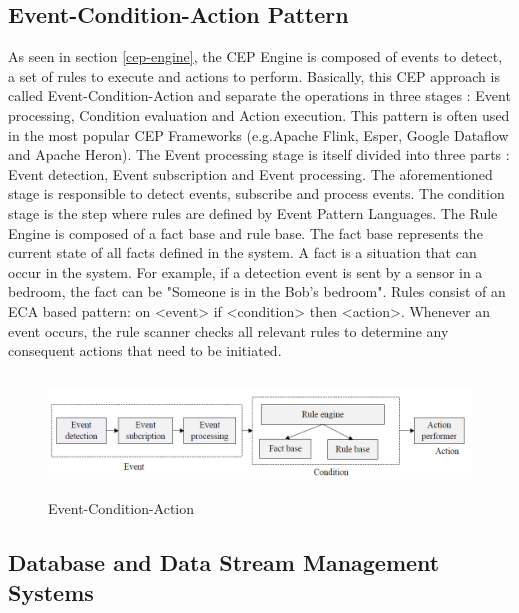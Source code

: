 \documentclass[11pt]{article}
\begin{document}

\subsection{Event-Condition-Action Pattern}

As seen in section \ref{cep-engine}, the CEP Engine is composed of events to detect, a set of rules to execute and actions to perform. Basically, this CEP approach is called Event-Condition-Action and separate the operations in three stages : Event processing, Condition evaluation and Action execution. This pattern is often used in the most popular CEP Frameworks (e.g.Apache Flink, Esper, Google Dataflow and Apache Heron). The Event processing stage is itself divided into three parts : Event detection, Event subscription and Event processing. The aforementioned stage is responsible to detect events, subscribe and process events. The condition stage is the step where rules are defined by Event Pattern Languages. The Rule Engine is composed of a fact base and rule base. The fact base represents the current state of all facts defined in the system. A fact is a situation that can occur in the system. For example, if a detection event is sent by a sensor in a bedroom, the fact can be "Someone is in the Bob's bedroom". Rules consist of an ECA based pattern: on {<}event{>} if {<}condition{>} then {<}action{>}. Whenever an event occurs, the rule scanner checks all relevant rules to determine any consequent actions that need to be initiated. \cite{IoT Architecture based on services and Events}

\begin{figure}[h]
	\includegraphics[width=\textwidth,height=90pt]{assets/ECA_illustration.png}
	\caption{Event-Condition-Action}
	\label{fig:Event-Condition-Action}
\end{figure}

\subsection{Database and Data Stream Management Systems}
\end{document}
